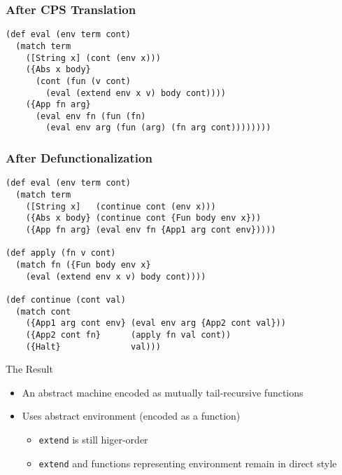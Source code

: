\documentclass{beamer}
\begin{document}
\begin{frame}[fragile]
  \frametitle{After CPS Translation}
  \begin{lstlisting}
(def eval (env term cont)
  (match term
    ([String x] (cont (env x)))
    ({Abs x body}
      (cont (fun (v cont)
        (eval (extend env x v) body cont))))
    ({App fn arg}
      (eval env fn (fun (fn)
        (eval env arg (fun (arg) (fn arg cont))))))))
  \end{lstlisting}
\end{frame}

\begin{frame}[fragile]
  \frametitle{After Defunctionalization}
  \begin{lstlisting}
(def eval (env term cont)
  (match term
    ([String x]   (continue cont (env x)))
    ({Abs x body} (continue cont {Fun body env x}))
    ({App fn arg} (eval env fn {App1 arg cont env}))))

(def apply (fn v cont)
  (match fn ({Fun body env x}
    (eval (extend env x v) body cont))))

(def continue (cont val)
  (match cont
    ({App1 arg cont env} (eval env arg {App2 cont val}))
    ({App2 cont fn}      (apply fn val cont))
    ({Halt}              val)))
  \end{lstlisting}
\end{frame}

\begin{frame}{The Result}
  \begin{itemize}
    \item An abstract machine encoded as mutually tail-recursive functions
    \item Uses abstract environment (encoded as a function)
    \begin{itemize}
      \item \lstinline{extend} is still higer-order
      \item \lstinline{extend} and functions representing environment remain in direct style
    \end{itemize}
  \end{itemize}
\end{frame}
\end{document}
